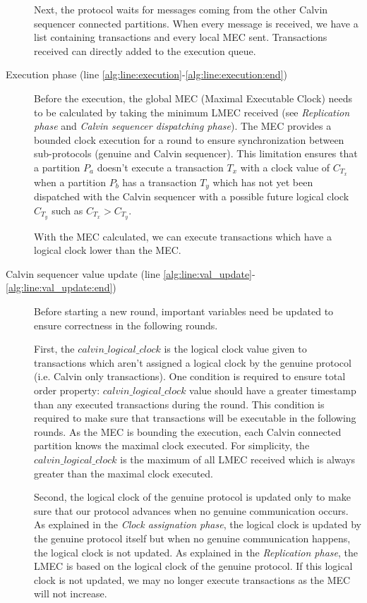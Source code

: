 \documentclass[a4paper, 10pt]{article}
\newcommand{\PE}{Calvin}
\begin{document}
\begin{description}
        Next, the protocol waits for messages coming from the other Calvin sequencer connected partitions.
        When every message is received, we have a list containing transactions and every local MEC sent.
        Transactions received can directly added to the execution queue.

    \item[Execution phase (line \ref{alg:line:execution}-\ref{alg:line:execution:end})]
        Before the execution, the global MEC (Maximal Executable Clock) needs to
        be calculated by taking the minimum LMEC received (see
        \textit{Replication phase} and \textit{Calvin sequencer dispatching phase}). The MEC provides a
        bounded clock execution for a round to ensure synchronization between sub-protocols (genuine and Calvin sequencer).
        This limitation ensures that a partition $P_a$ doesn't
        execute a transaction $T_x$ with a clock value of $C_{T_x}$ when a partition $P_b$ has a
        transaction $T_y$ which has not yet been dispatched with the Calvin sequencer with a
        possible future logical clock $C_{T_y}$ such as $C_{T_x} > C_{T_y}$.

        With the MEC calculated, we can execute transactions which have a logical clock lower than the MEC.

    \item[Calvin sequencer value update (line \ref{alg:line:val_update}-\ref{alg:line:val_update:end})]
        Before starting a new round, important variables need be updated
        to ensure correctness in the following rounds.

        First, the $calvin\_logical\_clock$ is the logical clock value given to transactions which aren't assigned a
        logical clock by the genuine protocol (i.e. Calvin only transactions). One condition is
        required to ensure total order property: $calvin\_logical\_clock$ value should have a
        greater timestamp than any executed transactions during the round. This condition is
        required to make sure that transactions will be executable in the following rounds.
        As the MEC is bounding the execution, each \PE{} connected partition knows the
        maximal clock executed. For simplicity, the $calvin\_logical\_clock$ is the maximum of
        all LMEC received which is always greater than the maximal clock executed.

        Second, the logical clock of the genuine protocol is updated only to make sure that our protocol advances when
        no genuine communication occurs. As explained in the \textit{Clock assignation phase}, the logical clock
        is updated by the genuine protocol itself but when no genuine communication happens, the logical clock is not updated.
        As explained in the \textit{Replication phase}, the LMEC is based on the logical clock of the genuine protocol.
        If this logical clock is not updated, we may no longer execute transactions as the MEC will not increase.

\end{description}
\end{document}

